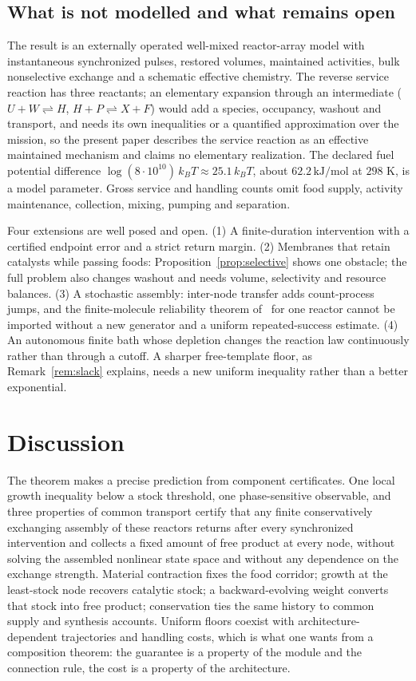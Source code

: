 \documentclass[11pt,a4paper]{article}
\theoremstyle{plain}
\theoremstyle{definition}
\theoremstyle{remark}
\begin{document}
\subsection{What is not modelled and what remains open}\label{sec:open}
The result is an externally operated well-mixed reactor-array model with instantaneous synchronized pulses, restored volumes, maintained activities, bulk nonselective exchange and a schematic effective chemistry. The reverse service reaction has three reactants; an elementary expansion through an intermediate ($U+W\rightleftharpoons H$, $H+P\rightleftharpoons X+F$) would add a species, occupancy, washout and transport, and needs its own inequalities or a quantified approximation over the mission, so the present paper describes the service reaction as an effective maintained mechanism and claims no elementary realization. The declared fuel potential difference $\log(8\cdot10^{10})\,k_BT\approx25.1\,k_BT$, about $62.2\,\mathrm{kJ/mol}$ at $298$ K, is a model parameter. Gross service and handling counts omit food supply, activity maintenance, collection, mixing, pumping and separation.

Four extensions are well posed and open. (1) A finite-duration intervention with a certified endpoint error and a strict return margin. (2) Membranes that retain catalysts while passing foods: Proposition~\ref{prop:selective} shows one obstacle; the full problem also changes washout and needs volume, selectivity and resource balances. (3) A stochastic assembly: inter-node transfer adds count-process jumps, and the finite-molecule reliability theorem of~\citep{finiteharvest2026} for one reactor cannot be imported without a new generator and a uniform repeated-success estimate. (4) An autonomous finite bath whose depletion changes the reaction law continuously rather than through a cutoff. A sharper free-template floor, as Remark~\ref{rem:slack} explains, needs a new uniform inequality rather than a better exponential.

\section{Discussion}\label{sec:discussion}
The theorem makes a precise prediction from component certificates. One local growth inequality below a stock threshold, one phase-sensitive observable, and three properties of common transport certify that any finite conservatively exchanging assembly of these reactors returns after every synchronized intervention and collects a fixed amount of free product at every node, without solving the assembled nonlinear state space and without any dependence on the exchange strength. Material contraction fixes the food corridor; growth at the least-stock node recovers catalytic stock; a backward-evolving weight converts that stock into free product; conservation ties the same history to common supply and synthesis accounts. Uniform floors coexist with architecture-dependent trajectories and handling costs, which is what one wants from a composition theorem: the guarantee is a property of the module and the connection rule, the cost is a property of the architecture.
\end{document}
